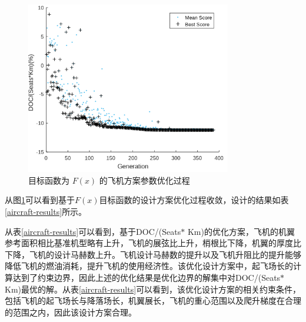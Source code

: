 \documentclass[12pt,a4paper]{report}
\begin{document}
\begin{figure}[H]
	\centering
		\includegraphics[width=0.8\textwidth]{./media4/aircraft-doc.png}
		\caption{目标函数为 $ F \left( x \right)  $ 的飞机方案参数优化过程}
		\label{fig:g48_aircraftdoc}
\end{figure}
从图\ref{fig:g48_aircraftdoc}可以看到基于$F(x)$目标函数的设计方案优化过程收敛，设计的结果如表\ref{aircraft-results}所示。

从表\ref{aircraft-results}可以看到，基于DOC/(Seats$\ast$ Km)的优化方案，飞机的机翼参考面积相比基准机型略有上升，飞机的展弦比上升，梢根比下降，机翼的厚度比下降，飞机的设计马赫数上升。飞机设计马赫数的提升以及飞机升阻比的提升能够降低飞机的燃油消耗，提升飞机的使用经济性。该优化设计方案中，起飞场长的计算达到了约束边界，因此上述的优化结果是优化边界的解集中对DOC/(Seats$\ast$ Km)最优的解。从表\ref{aircraft-results}可以看到，该优化设计方案的相关约束条件，包括飞机的起飞场长与降落场长，机翼展长，飞机的重心范围以及爬升梯度在合理的范围之内，因此该设计方案合理。
\end{document}
